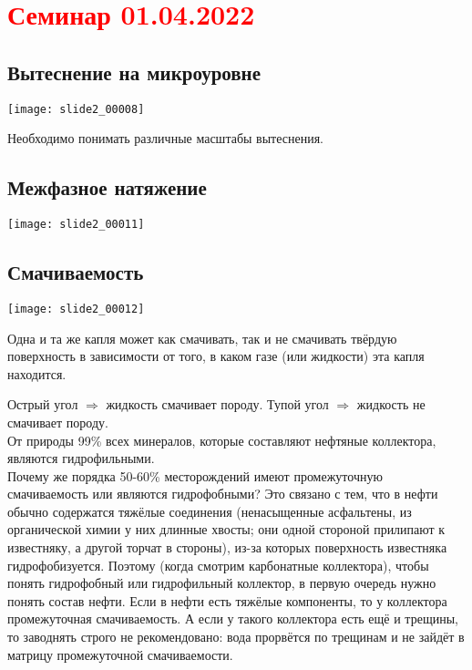 \documentclass[main.tex]{subfiles}
\begin{document}
\section{\textcolor{red}{Семинар 01.04.2022}}

\subsection{Вытеснение на микроуровне}

\texttt{[image: slide2\_00008]}

Необходимо понимать различные масштабы вытеснения.


\subsection{Межфазное натяжение}

\texttt{[image: slide2\_00011]}

\subsection{Смачиваемость}

\texttt{[image: slide2\_00012]}

Одна и та же капля может как смачивать, так и не смачивать твёрдую поверхность в зависимости от того, в каком газе (или жидкости) эта капля находится.


Острый угол $\Rightarrow$ жидкость смачивает породу. Тупой угол $\Rightarrow$ жидкость не смачивает породу.\\

От природы 99\% всех минералов, которые составляют нефтяные коллектора, являются гидрофильными.\\

Почему же порядка 50-60\% месторождений имеют промежуточную смачиваемость или являются гидрофобными? Это связано с тем, что в нефти обычно содержатся тяжёлые соединения (ненасыщенные асфальтены, из органической химии у них длинные хвосты; они одной стороной прилипают к известняку, а другой торчат в стороны), из-за которых поверхность известняка гидрофобизуется.
Поэтому (когда смотрим карбонатные коллектора), чтобы понять гидрофобный или гидрофильный коллектор, в первую очередь нужно понять состав нефти. Если в нефти есть тяжёлые компоненты, то у коллектора промежуточная смачиваемость.
А если у такого коллектора есть ещё и трещины, то заводнять строго не рекомендовано: вода прорвётся по трещинам и не зайдёт в матрицу промежуточной смачиваемости.
\end{document}
